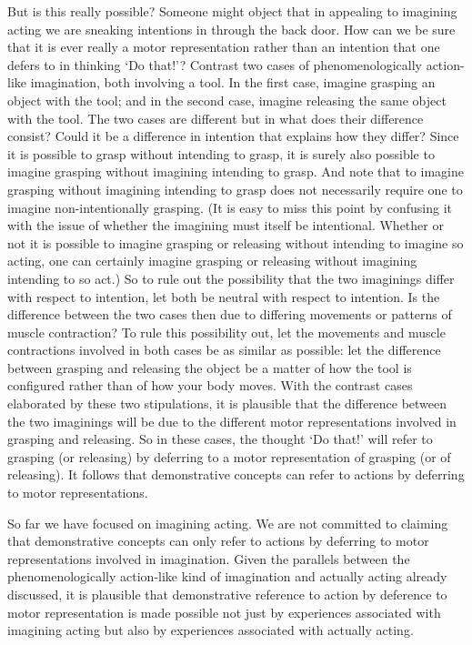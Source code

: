 \documentclass[12pt,\papersize]{extarticle}
\begin{document}
But is this really possible? Someone might object that in appealing to imagining acting we are sneaking intentions in through the back door. How can we be sure that it is ever really a motor representation rather than an intention that one defers to in thinking `Do that!'?  Contrast two cases of phenomenologically action-like imagination, both involving a tool. In the first case, imagine grasping an object with the tool; and in the second case, imagine releasing the same object with the tool. The two cases are different but in what does their difference consist? 
Could it be a difference in intention that explains how they differ?  
Since it is possible to grasp without intending to grasp, it is surely also possible to imagine grasping without imagining intending to grasp. 
And note that to imagine grasping without imagining intending to grasp does not necessarily require one to imagine non-intentionally grasping. 
(It is easy to miss this point by confusing it with the issue of whether the imagining must itself be intentional. Whether or not it is possible to imagine grasping or releasing without intending to imagine so acting, one can certainly imagine grasping or releasing without  imagining intending to so act.) So to rule out the possibility that the two imaginings differ with respect to intention, let both be neutral with respect to intention. Is the difference between the two cases then due to differing movements or patterns of muscle contraction? To rule this possibility out, let the movements and muscle contractions involved in both cases be as similar as possible: let the difference between grasping and releasing the object be a matter of how the tool is configured rather than of how your body moves. With the contrast cases elaborated by these two stipulations, it is plausible that the difference between the two imaginings will be due to the different motor representations involved in grasping and releasing. So in these cases, the thought `Do that!' will refer to grasping (or releasing) by deferring to a motor representation of grasping (or of releasing). It follows that demonstrative concepts can refer to actions by deferring to motor representations.

So far we have focused on imagining acting. We are not committed to claiming that demonstrative concepts can only refer to actions by deferring to motor representations involved in imagination. Given the parallels between the phenomenologically action-like kind of imagination and actually acting already discussed, it is plausible that demonstrative reference to action by deference to motor representation is made possible not just by experiences associated with imagining acting but also by experiences associated with actually acting.
\end{document}
